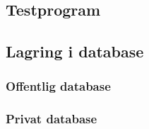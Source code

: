 \subsection{Testprogram}

\subsection{Lagring i database} 

\subsubsection{Offentlig database}

\subsubsection{Privat database}







